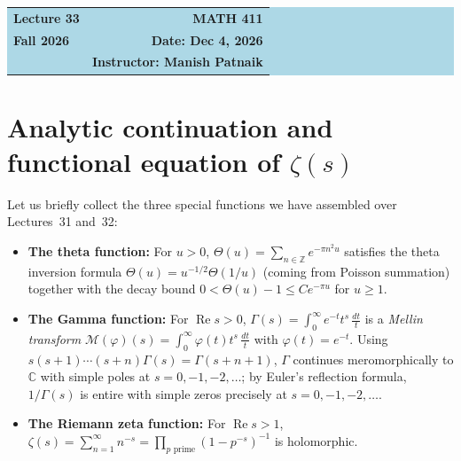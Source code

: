\documentclass[11pt]{article}
\theoremstyle{plain}
\theoremstyle{definition}
\theoremstyle{boldremark}
\theoremstyle{remark}
\numberwithin{equation}{section}
\newcommand{\C}{\mathbb{C}}
\newcommand{\Z}{\mathbb{Z}}
\DeclareMathOperator{\Real}{Re}
\begin{document}
\begin{center}
  \colorbox{lightblue}{%
    \begin{minipage}{0.94\textwidth}
      \vspace{0.55em}
      \begin{tabular*}{\textwidth}{@{\extracolsep{\fill}}lr}
        {\color{courseblue}\bfseries\LARGE Lecture 33} &
        {\color{courseblue}\bfseries\LARGE MATH 411}\\[0.35em]
        \textbf{Fall 2026} & \textbf{Date: Dec 4, 2026}\\
        & \textbf{Instructor: Manish Patnaik}
      \end{tabular*}
      \vspace{0.45em}
    \end{minipage}}
\end{center}

\setcounter{tocdepth}{1}
\tableofcontents
\vspace{0.45em}

\section{Analytic continuation and functional equation of \texorpdfstring{$\zeta(s)$}{zeta(s)}}

Let us briefly collect the three special functions we have assembled over
Lectures~31 and~32:
\begin{itemize}
 \item \textbf{The theta function:} For $u>0$,
       $\Theta(u)=\sum_{n\in\Z} e^{-\pi n^2 u}$ satisfies the theta
       inversion formula $\Theta(u)=u^{-1/2}\Theta(1/u)$ (coming from
       Poisson summation) together with the decay bound
       $0<\Theta(u)-1\leq Ce^{-\pi u}$ for $u\geq 1$.
 \item \textbf{The Gamma function:} For $\Real s>0$,
       $\Gamma(s)=\int_0^{\infty} e^{-t}t^s\,\frac{dt}{t}$ is a
       \emph{Mellin transform} $\mathcal M(\varphi)(s)=\int_0^{\infty}\varphi(t)t^s\,\frac{dt}{t}$
       with $\varphi(t)=e^{-t}$. Using $s(s+1)\cdots(s+n)\Gamma(s)=\Gamma(s+n+1)$,
       $\Gamma$ continues meromorphically to $\C$ with simple poles at
       $s=0,-1,-2,\dots$; by Euler's reflection formula, $1/\Gamma(s)$ is
       entire with simple zeros precisely at $s=0,-1,-2,\dots$.
 \item \textbf{The Riemann zeta function:} For $\Real s>1$,
       $\zeta(s)=\sum_{n=1}^{\infty} n^{-s}=\prod_{p\text{ prime}}(1-p^{-s})^{-1}$
       is holomorphic.
\end{itemize}
\end{document}
